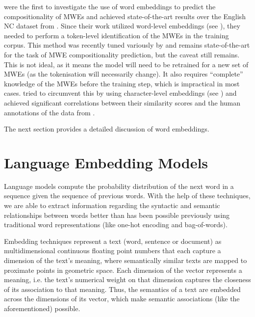 \cite{Salehi2015} were the first to investigate the use of word embeddings to predict the compositionality of MWEs and achieved state-of-the-art results over the English NC dataset from \cite{Reddy2011}. Since their work utilized word-level embeddings (see ), they needed to perform a token-level identification of the MWEs in the training corpus. This method was recently tuned variously by \cite{Cordeiro2019} and remains state-of-the-art for the task of MWE compositionality prediction, but the caveat still remains. This is not ideal, as it means the model will need to be retrained for a new set of MWEs (as the tokenisation will necessarily change). It also requires ``complete'' knowledge of the MWEs before the training step, which is impractical in most cases. \cite{Hakimi2018} tried to circumvent this by using character-level embeddings (see ) and achieved significant correlations between their similarity scores and the human annotations of the data from \cite{Reddy2011}.

\noindent
The next section provides a detailed discussion of word embeddings.

\section{Language Embedding Models}
\label{sec:emb}
Language models compute the probability distribution of the next word in a sequence given the sequence of previous words. With the help of these techniques, we are able to extract information regarding the syntactic and semantic relationships between words better than has been possible previously using traditional word representations (like one-hot encoding and bag-of-words).

Embedding techniques represent a text (word, sentence or document) as multidimensional continuous floating point numbers that each capture a dimension of the text's meaning, where semantically similar texts are mapped to proximate points in geometric space. Each dimension of the vector represents a meaning, i.e. the text's numerical weight on that dimension captures the closeness of its association to that meaning. Thus, the semantics of a text are embedded across the dimensions of its vector, which make semantic associations (like the aforementioned) possible.
